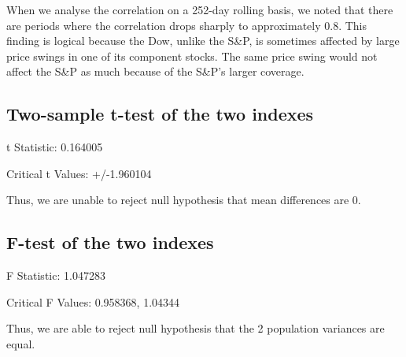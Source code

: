 \documentclass[a4paper]{article}
\begin{document}
When we analyse the correlation on a 252-day rolling basis, we noted that there are periods where the correlation drops sharply to approximately 0.8. This finding is logical because the Dow, unlike the S\&P, is sometimes affected by large price swings in one of its component stocks. The same price swing would not affect the S\&P as much because of the S\&P’s larger coverage.  


\subsection{Two-sample t-test of the two indexes}
\begin{flushleft}
t Statistic: 0.164005

Critical t Values: +/-1.960104

Thus, we are unable to reject null hypothesis that mean differences are 0.
\end{flushleft}

\subsection{F-test of the two indexes}
\begin{flushleft}
F Statistic: 1.047283

Critical F Values: 0.958368, 1.04344

Thus, we are able to reject null hypothesis that the 2 population variances are equal.
\end{flushleft}


\end{document}
